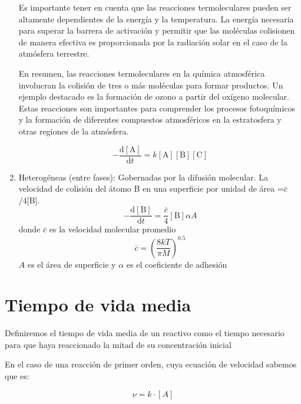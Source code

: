 \begin{enumerate}
Es importante tener en cuenta que las reacciones termoleculares pueden ser altamente dependientes de la energía y la temperatura. La energía necesaria para superar la barrera de activación y permitir que las moléculas colisionen de manera efectiva es proporcionada por la radiación solar en el caso de la atmósfera terrestre.

En resumen, las reacciones termoleculares en la química atmosférica involucran la colisión de tres o más moléculas para formar productos. Un ejemplo destacado es la formación de ozono a partir del oxígeno molecular. Estas reacciones son importantes para comprender los procesos fotoquímicos y la formación de diferentes compuestos atmosféricos en la estratosfera y otras regiones de la atmósfera.


 \begin{equation*} -\frac{\mathrm{d}[\textrm{A}]}{\mathrm{d}t}=k[\textrm{A}][\textrm{B}][\textrm{C}]
 \end{equation*}
 
 \item Heterog\'eneas (entre fases): Gobernadas por la difusi\'on molecular. La velocidad de colisi\'on del \'atomo B en una superficie por unidad de \'area =$\bar{c}$/4[B]. 
\begin{equation*}
-\frac{\mathrm{d}[\textrm{B}]}{\mathrm{d}t}=\frac{\bar{c}}{4}[\textrm{B}]\alpha A
\end{equation*}
 donde $\bar{c}$ es la velocidad molecular promedio \begin{equation}
\bar{c}=\left(\frac{8kT}{\pi M}\right)^{0.5}
\end{equation}
$A$ es el \'area de superficie y $\alpha$ es el coeficiente de adhesi\'on
\end{enumerate}

\section{Tiempo de vida media}\label{TVDM}
Definiremos el tiempo de vida media de un reactivo como el tiempo necesario para que haya reaccionado la mitad de su concentración inicial

En el caso de una reacción de primer orden, cuya ecuación de velocidad sabemos que es: 

\begin{equation*}
\nu =k\cdot [A]
\end{equation*}

